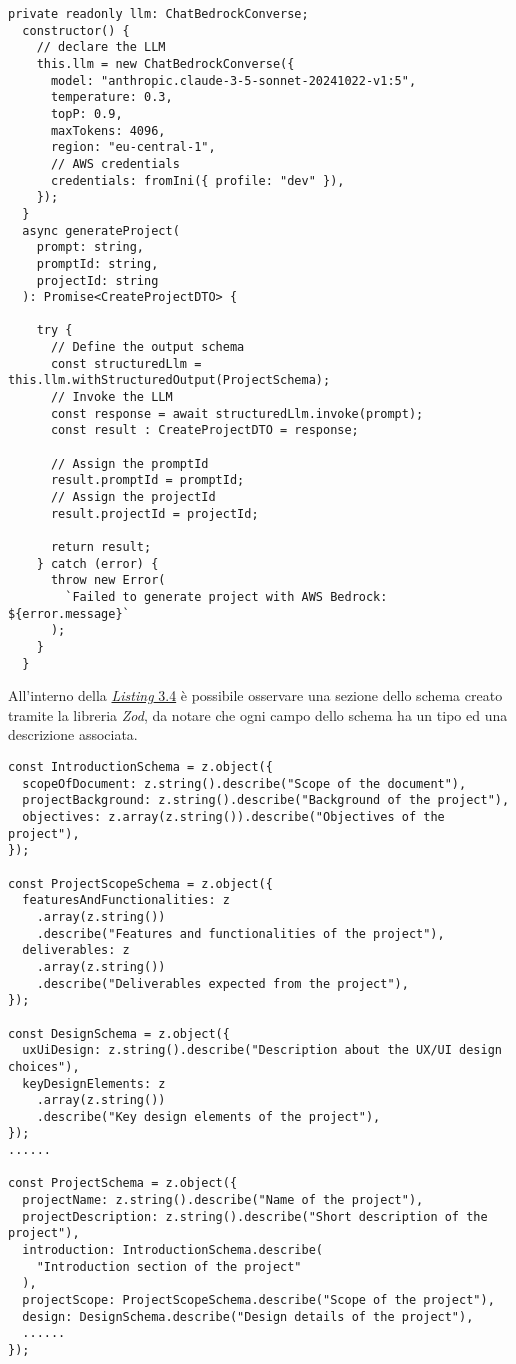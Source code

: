 \begin{lstlisting}[caption={Dichiarazione \gls{llm} e sua invocazione}, label={lst:funzione-generazione-progetto}]
private readonly llm: ChatBedrockConverse;
  constructor() {  
    // declare the LLM
    this.llm = new ChatBedrockConverse({
      model: "anthropic.claude-3-5-sonnet-20241022-v1:5",
      temperature: 0.3,
      topP: 0.9,
      maxTokens: 4096,
      region: "eu-central-1",
      // AWS credentials
      credentials: fromIni({ profile: "dev" }), 
    });
  }
  async generateProject(
    prompt: string,
    promptId: string,
    projectId: string
  ): Promise<CreateProjectDTO> {

    try {
      // Define the output schema
      const structuredLlm = this.llm.withStructuredOutput(ProjectSchema); 
      // Invoke the LLM
      const response = await structuredLlm.invoke(prompt); 
      const result : CreateProjectDTO = response;

      // Assign the promptId
      result.promptId = promptId; 
      // Assign the projectId
      result.projectId = projectId; 

      return result;
    } catch (error) {
      throw new Error(
        `Failed to generate project with AWS Bedrock: ${error.message}`
      );
    }
  }
\end{lstlisting}
\pagebreak
\noindent All'interno della {\hyperref[lst:funzione-generazione-progetto]{\textit{Listing} 3.4}} è possibile osservare una sezione dello schema creato tramite la libreria \textit{Zod}, da notare che ogni campo dello schema ha un tipo ed una descrizione associata. 

\begin{lstlisting}[caption={Schema \textit{Zod} dell'output dell'\gls{llm}}, label={lst:schema-zod}]
const IntroductionSchema = z.object({
  scopeOfDocument: z.string().describe("Scope of the document"),
  projectBackground: z.string().describe("Background of the project"),
  objectives: z.array(z.string()).describe("Objectives of the project"),
});

const ProjectScopeSchema = z.object({
  featuresAndFunctionalities: z
    .array(z.string())
    .describe("Features and functionalities of the project"),
  deliverables: z
    .array(z.string())
    .describe("Deliverables expected from the project"),
});

const DesignSchema = z.object({
  uxUiDesign: z.string().describe("Description about the UX/UI design choices"),
  keyDesignElements: z
    .array(z.string())
    .describe("Key design elements of the project"),
});
......

const ProjectSchema = z.object({
  projectName: z.string().describe("Name of the project"),
  projectDescription: z.string().describe("Short description of the project"),
  introduction: IntroductionSchema.describe(
    "Introduction section of the project"
  ),
  projectScope: ProjectScopeSchema.describe("Scope of the project"),
  design: DesignSchema.describe("Design details of the project"),
  ......
});
\end{lstlisting}

